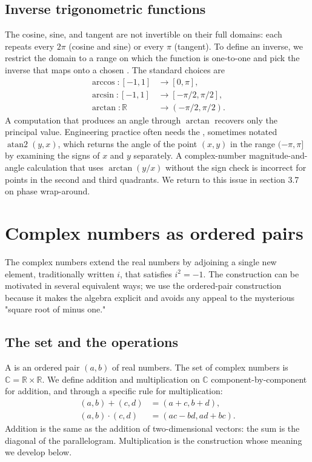\subsection{Inverse trigonometric functions}

The cosine, sine, and tangent are not invertible on their full
domains: each repeats every $2\pi$ (cosine and sine) or every
$\pi$ (tangent). To define an inverse, we restrict the domain to
a range on which the function is one-to-one and pick the inverse
that maps onto a chosen . The standard
choices are
\begin{align*}
\arccos: [-1, 1] &\to [0, \pi], \\
\arcsin: [-1, 1] &\to [-\pi/2, \pi/2], \\
\arctan: \mathbb{R} &\to (-\pi/2, \pi/2).
\end{align*}
A computation that produces an angle through $\arctan$ recovers
only the principal value. Engineering practice often needs the
, sometimes notated
$\operatorname{atan2}(y, x)$, which returns the angle of the point
$(x, y)$ in the range $(-\pi, \pi]$ by examining the signs of $x$
and $y$ separately. A complex-number magnitude-and-angle
calculation that uses $\arctan(y/x)$ without the sign check is
incorrect for points in the second and third quadrants. We return
to this issue in section 3.7 on phase wrap-around.

\section{Complex numbers as ordered pairs}

The complex numbers extend the real numbers by adjoining a single
new element, traditionally written $i$, that satisfies $i^{2} =
-1$. The construction can be motivated in several equivalent ways;
we use the ordered-pair construction because it makes the algebra
explicit and avoids any appeal to the mysterious "square root of
minus one."

\subsection{The set and the operations}

A  is an ordered pair $(a, b)$ of real
numbers. The set of complex numbers is $\mathbb{C} = \mathbb{R}
\times \mathbb{R}$. We define addition and multiplication on
$\mathbb{C}$ component-by-component for addition, and through a
specific rule for multiplication:
\begin{align*}
(a, b) + (c, d) &= (a + c, b + d), \\
(a, b) \cdot (c, d) &= (ac - bd, ad + bc).
\end{align*}
Addition is the same as the addition of two-dimensional vectors:
the sum is the diagonal of the parallelogram. Multiplication is
the construction whose meaning we develop below.

